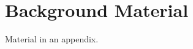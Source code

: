 \documentclass[\main/thesis.tex]{subfiles}
\begin{document}
\chapter{Background Material}

Material in an appendix.


\end{document}
